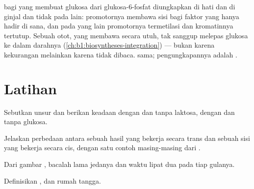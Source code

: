 \begin{example}\label{ex:b1:expression-control:twoorgans}
 bagi  yang membuat glukosa dari glukosa-6-fosfat diungkapkan
di hati dan di ginjal dan tidak pada  lain: promotornya membawa
sisi bagi faktor yang hanya hadir di sana, dan pada  yang lain
promotornya termetilasi dan kromatinnya tertutup. Sebuah otot, yang
membawa  secara utuh, tak sanggup melepas glukosa ke dalam
darahnya (\cref{ch:b1:biosyntheses-integration}) --- bukan karena
kekurangan  melainkan karena  tidak dibaca.  sama;
pengungkapannya adalah .
\end{example}

\section{Latihan}

\begin{exercise}[$\star$]\label{exo:b1:expression-control:1}
Sebutkan unsur  dan berikan keadaan  dengan dan
tanpa laktosa, dengan dan tanpa glukosa.
\end{exercise}

\begin{exercise}[$\star$]\label{exo:b1:expression-control:2}
Jelaskan perbedaan antara sebuah hasil  yang bekerja secara trans
dan sebuah sisi yang bekerja secara cis, dengan satu contoh
masing-masing dari .
\end{exercise}

\begin{exercise}[$\star$]\label{exo:b1:expression-control:3}
Dari gambar , bacalah lama jedanya dan waktu lipat dua pada
tiap gulanya.
\end{exercise}

\begin{exercise}[$\star$]\label{exo:b1:expression-control:4}
Definisikan ,  dan  rumah tangga.
\end{exercise}


